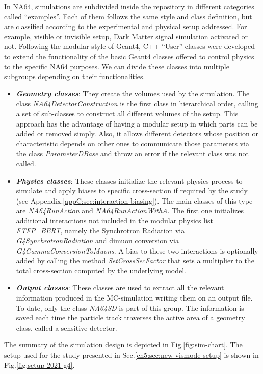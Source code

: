 In NA64, simulations are subdivided inside the repository in different categories called ``examples''. Each of them follows the same style and class definition, but are classified according to the experimental and physical setup addressed. For example, visible or invisible setup, Dark Matter signal simulation activated or not.
Following the modular style of Geant4, C++ ``User'' classes were developed to extend the functionality of the basic Geant4 classes offered to control physics to the specific NA64 purposes. We can divide these classes into multiple subgroups depending on their functionalities.

\begin{itemize}
\item \textbf{\textit{Geometry classes}}: They create the volumes used by the simulation. The class \textit{NA64DetectorConstruction} is the first class in hierarchical order, calling a set of sub-classes to construct all different volumes of the setup. This approach has the advantage of having a modular setup in which parts can be added or removed simply. Also, it allows different detectors whose position or characteristic depends on other ones to communicate those parameters via the class \textit{ParameterDBase} and throw an error if the relevant class was not called.
\item \textbf{\textit{Physics classes}}: These classes initialize the relevant physics process to simulate and apply biases to specific cross-section if required by the study (see Appendix.\ref{appC:sec:interaction-biasing}). The main classes of this type are \textit{NA64RunAction} and \textit{NA64RunActionWithA}. The first one initializes additional interactions not included in the modular physics list \textit{FTFP\_BERT}, namely the Synchrotron Radiation via \textit{G4SynchrotronRadiation} and dimuon conversion via \textit{G4GammaConversionToMuons}. A bias to these two interactions is optionally added by calling the method \textit{SetCrossSecFactor} that sets a multiplier to the total cross-section computed by the underlying model.
\item \textbf{\textit{Output classes}}: These classes are used to extract all the relevant information produced in the MC-simulation writing them on an output file. To date, only the class \textit{NA64SD} is part of this group. The information is saved each time the particle track traverses the active area of a geometry class, called a sensitive detector. 
\end{itemize}


The summary of the simulation design is depicted in Fig.\ref{fig:sim-chart}. The setup used for the study presented in Sec.\ref{ch5:sec:new-vismode-setup} is shown in Fig.\ref{fig:setup-2021-g4}.

